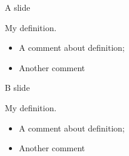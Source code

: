 \documentclass[10pt]{beamer}
\begin{document}
\begin{frame}{A slide} 
\begin{definizione}[A definition]

My definition. 

\end{definizione}\pause

\begin{itemize}
\item A comment about definition;\pause
\item Another comment
\end{itemize}
\end{frame}

\begin{frame}{B slide} 
\begin{definition}[A definition]

My definition. 

\end{definition}\pause

\begin{itemize}
\item A comment about definition;\pause
\item Another comment
\end{itemize}
\end{frame}
\end{document}
